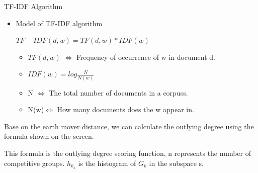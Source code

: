\documentclass[
 size=14pt,
 paper=smartboard,  %
 mode=present, 		%
 display=slides, 	%
 style=tuliplab,  	%
 pauseslide,
 fleqn,leqno]{powerdot}
\begin{document}
\begin{slide}[toc=,bm=]{TF-IDF Algorithm}

  \begin{itemize}
  \item
  Model of TF-IDF algorithm
  
  \vspace{1.2cm}
  
  \begin{centering}
   
  $ TF-IDF (d, w) = TF (d, w) *IDF(w)$
  
  
  \end{centering}
  
  \begin{itemize}
  
  \item
  $TF(d,w)$ $\Leftrightarrow$ Frequency of occurrence of w in document d.
  \item
  $IDF(w) = log\frac{N}{N(w)}$
  \item
  N $\Leftrightarrow$ The total number of documents in a corpuss.
  \item
  N(w)$\Leftrightarrow$ How many documents does the w appear in.
  
  \end{itemize}
  \end{itemize}
  
  \begin{note}
  Base on the earth mover distance,
  we can calculate the outlying degree using the formula shown on the screen.
  
  This formula is the outlying degree scoring function,
  n represents the number of competitive groups.
  $h_{k_s}$ is the histogram of $G_k$ in the subspace s.
  \end{note}
  
  \end{slide}
\end{document}
